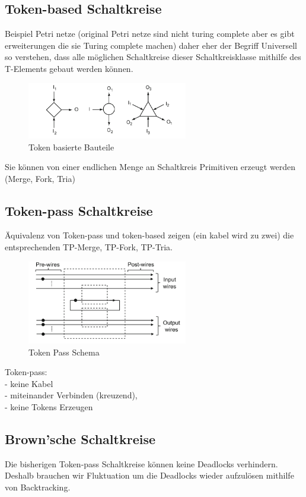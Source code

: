 \subsection{Token-based Schaltkreise}
Beispiel Petri netze (original Petri netze sind nicht turing complete aber 
es gibt erweiterungen die sie Turing complete machen) daher eher 
der Begriff Universell so verstehen, dass alle möglichen Schaltkreise
dieser Schaltkreisklasse mithilfe des T-Elements gebaut werden können.
%
\begin{figure}[h]
    \includegraphics[width=7cm]{bilder/tokenBased.png}
    \caption{Token basierte Bauteile}
\end{figure}    


Sie können von einer endlichen Menge an Schaltkreis Primitiven 
erzeugt werden (Merge, Fork, Tria)


\subsection{Token-pass Schaltkreise}
Äquivalenz von Token-pass und token-based zeigen (ein kabel wird zu zwei)
die entsprechenden TP-Merge, TP-Fork, TP-Tria.
%
\begin{figure}[h]
  \begin{minipage}{0.45\textwidth}
    \centering
    \includegraphics[width=7cm]{bilder/TokenPassScheme.png}
    \caption{Token Pass Schema}
  \end{minipage}\hfill   
\end{figure} 


Token-pass: \\
- keine Kabel \\
- miteinander Verbinden (kreuzend),\\
- keine Tokens Erzeugen

\subsection{Brown'sche Schaltkreise}
Die bisherigen Token-pass Schaltkreise können keine Deadlocks verhindern. 
%
Deshalb brauchen wir Fluktuation um die Deadlocks wieder aufzulösen mithilfe 
von Backtracking.

